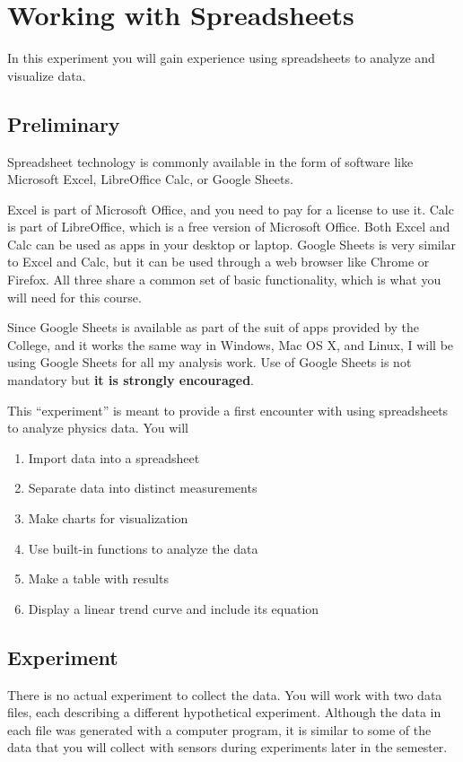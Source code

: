 \chapter{Working with Spreadsheets}
%
In this experiment you will gain experience using spreadsheets to analyze and visualize data.
%
\section{Preliminary}
%
Spreadsheet technology is commonly available in the form of software like Microsoft Excel, LibreOffice Calc, or Google Sheets.

Excel is part of Microsoft Office, and you need to pay for a license to use it. Calc is part of LibreOffice, which is a free version of Microsoft Office. Both Excel and Calc can be used as apps in your desktop or laptop. Google Sheets is very similar to Excel and Calc, but it can be used through a web browser like Chrome or Firefox. All three share a common set of basic functionality, which is what you will need for this course.

Since Google Sheets is available as part of the suit of apps provided by the College, and it works the same way in Windows, Mac OS X, and Linux, I will be using Google Sheets for all my analysis work. Use of Google Sheets is not mandatory but \textbf{it is strongly encouraged}.

This ``experiment'' is meant to provide a first encounter with using spreadsheets to analyze physics data. You will
\begin{enumerate}
    \item Import data into a spreadsheet
    \item Separate data into distinct measurements
    \item Make charts for visualization
    \item Use built-in functions to analyze the data
    \item Make a table with results
    \item Display a linear trend curve and include its equation
\end{enumerate}
%
\section{Experiment}
%
There is no actual experiment to collect the data. You will work with two data files, each describing a different hypothetical experiment. Although the data in each file was generated with a computer program, it is similar to some of the data that you will collect with sensors during experiments later in the semester.
%
